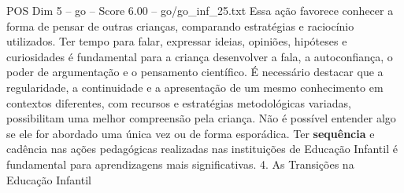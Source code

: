 \begin{textsample}{POS Dim 5 – go – Score 6.00 – go/go\_inf\_25.txt}
Essa ação favorece conhecer a forma de pensar de outras crianças, comparando estratégias e raciocínio utilizados.
Ter tempo para falar, expressar ideias, opiniões, hipóteses e curiosidades é fundamental para a criança desenvolver a fala, a autoconfiança, o poder de argumentação e o pensamento científico.
É necessário destacar que a regularidade, a continuidade e a apresentação de um mesmo conhecimento em contextos diferentes, com recursos e estratégias metodológicas variadas, possibilitam uma melhor compreensão pela criança.
Não é possível entender algo se ele for abordado uma única vez ou de forma esporádica.
Ter \textbf{sequência} e cadência nas ações pedagógicas realizadas nas instituições de Educação Infantil é fundamental para aprendizagens mais significativas. 4.
As Transições na Educação Infantil

\end{textsample}
